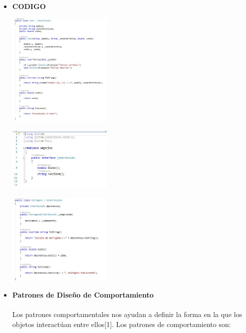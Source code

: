 \documentclass[twoside,twocolumn]{article}
\begin{document}
\begin{itemize}
\begin{itemize}
    \item \textbf{CODIGO}
    \begin{center}
        \includegraphics[width=5cm]{./img/Decorator1.jpg} 
    \end{center}
    \begin{center}
        \includegraphics[width=5cm]{./img/Decorator2.jpg} 
    \end{center}
    \begin{center}
        \includegraphics[width=5cm]{./img/Decorator3.jpg} 
    \end{center}

	
    \item \textbf{Patrones de Diseño de Comportamiento }
	\\
	\\Los patrones comportamentales nos ayudan a definir la forma en la que los objetos interactúan entre ellos[1]. Los patrones de comportamiento son:
    

\end{itemize}
\end{itemize}
\end{document}
